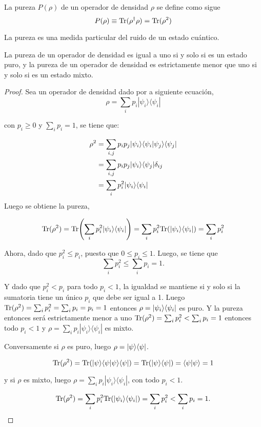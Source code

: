 \begin{definition} La pureza $P(\rho)$ de un operador de densidad $\rho$ se define como sigue {\cite{wilde2011classical}}
\begin{equation}
	P(\rho)\equiv{\rm Tr}(\rho^\dagger\rho)={\rm Tr}(\rho^2)
\end{equation}

	\end{definition}

La pureza es una medida particular del ruido de un estado cuántico.

\begin{proposition}
	La pureza de un operador de densidad es igual a uno si y solo si es un estado puro, y la pureza de un operador de densidad es estrictamente menor que uno si y solo si es un estado mixto.
	\end{proposition}


\begin{proof}
	Sea un operador de densidad dado por a siguiente ecuación, \[\rho=\sum_i p_i |\psi_i\rangle \langle \psi_i|\]
	
	con $p_i\ge 0$ y $\sum_{i}p_i=1$, se tiene que:
	
	\begin{equation*}
		\begin{split}
			\rho^2&=\sum_{i,j} p_i p_j|\psi_i\rangle \langle \psi_i|\psi_j\rangle \langle \psi_j|\\
			&=\sum_{i,j} p_i p_j|\psi_i \rangle \langle \psi_j|\delta_{ij}\\
			&=\sum_i p_i^2|\psi_i \rangle \langle \psi_i|
			\end{split}
	\end{equation*}
	Luego se obtiene la pureza,
	
	\[{\rm Tr}(\rho^2)={\rm Tr}{\left(\sum_i p_i^2|\psi_i \rangle \langle \psi_i|\right)}=\sum_i p_i^2 {\rm Tr}(|\psi_i \rangle \langle\psi_i|)=\sum_i p_i^2\]
	
	Ahora, dado que $p_i^2 \le p_i $, puesto que $0 \le p_i \le 1$. Luego, se tiene que \[\sum_i p_i^2\le\sum_i p_i=1.\]
	
   Y dado que $p_i^2<p_i$ para todo $p_i<1$, la igualdad se mantiene si y solo si la sumatoria tiene un único $p_i$ que debe ser igual a 1. Luego 	${\rm Tr}(\rho^2)=\sum_{i}p_i^2=\sum_i p_i= p_i=1$ entonces $\rho=|\psi_i\rangle \langle\psi_i|$ es puro. Y la pureza entonces será estrictamente menor a uno  ${\rm Tr}(\rho^2)=\sum_{i}p_i^2<\sum_i p_i=1$ entonces todo $p_i<1$ y $\rho=\sum_i p_i |\psi_i\rangle \langle \psi_i|$ es mixto.
    
     
	Conversamente si $\rho $ es puro, luego $\rho=|\psi\rangle \langle \psi|$.
	
	\[{\rm Tr}(\rho^2)={\rm Tr}(|\psi\rangle \langle \psi|\psi\rangle \langle \psi|)={\rm Tr}(|\psi\rangle \langle \psi|)=\langle\psi|\psi\rangle=1\]
	
	y si $\rho $ es mixto, luego $\rho=\sum_i p_i|\psi_i\rangle \langle \psi_i|$, con todo $p_i<1$.
	
	
	
	\[{\rm Tr}(\rho^2)=\sum_i p_i^2 {\rm Tr}(|\psi_i \rangle \langle\psi_i|)=\sum_i p_i^2<\sum_i p_i=1.\]
	\end{proof}



